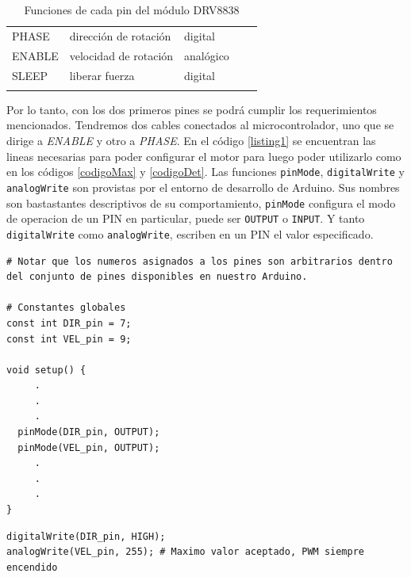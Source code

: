 \begin{table}[h]
\centering
\begin{tabular}{lllll}
\cline{1-3}
\multicolumn{1}{|l|}{PHASE}  & \multicolumn{1}{l|}{dirección de rotación} & \multicolumn{1}{l|}{digital}   &  &  \\ \cline{1-3}
\multicolumn{1}{|l|}{ENABLE} & \multicolumn{1}{l|}{velocidad de rotación} & \multicolumn{1}{l|}{analógico} &  &  \\ \cline{1-3}
\multicolumn{1}{|l|}{SLEEP}  & \multicolumn{1}{l|}{liberar fuerza}        & \multicolumn{1}{l|}{digital}   &  &  \\ \cline{1-3}
                             &                                            &                                &  & 
\end{tabular}
\caption{Funciones de cada pin del módulo DRV8838}
\label{funciones_pin_drv8838}
\end{table}

Por lo tanto, con los dos primeros pines se podrá cumplir los requerimientos mencionados. Tendremos dos cables conectados al \gls{microcontrolador}, uno que se dirige a \textit{ENABLE} y otro a \textit{PHASE}. En el código \ref{listing1} se encuentran las lineas necesarias para poder configurar el motor para luego poder utilizarlo como en los códigos \ref{codigoMax} y \ref{codigoDet}. Las funciones \verb|pinMode|, \verb|digitalWrite| y \verb|analogWrite| son provistas por el entorno de desarrollo de Arduino. Sus nombres son bastastantes descriptivos de su comportamiento, \verb|pinMode| configura el modo de operacion de un PIN en particular, puede ser \verb|OUTPUT| o \verb|INPUT|. Y tanto \verb|digitalWrite| como \verb|analogWrite|, escriben en un PIN el valor especificado.

\begin{lstlisting}[caption=Configuración inicial del control del motor paso a paso.,label={listing1}]
# Notar que los numeros asignados a los pines son arbitrarios dentro del conjunto de pines disponibles en nuestro Arduino.

# Constantes globales
const int DIR_pin = 7;
const int VEL_pin = 9;

void setup() {
     .
     .
     .
  pinMode(DIR_pin, OUTPUT);
  pinMode(VEL_pin, OUTPUT);
     .
     .
     .
}
\end{lstlisting}

\begin{lstlisting}[caption=Configurar 
máxima velocidad giro en sentido horario.,label={codigoMax}]
digitalWrite(DIR_pin, HIGH);
analogWrite(VEL_pin, 255); # Maximo valor aceptado, PWM siempre encendido
\end{lstlisting}

